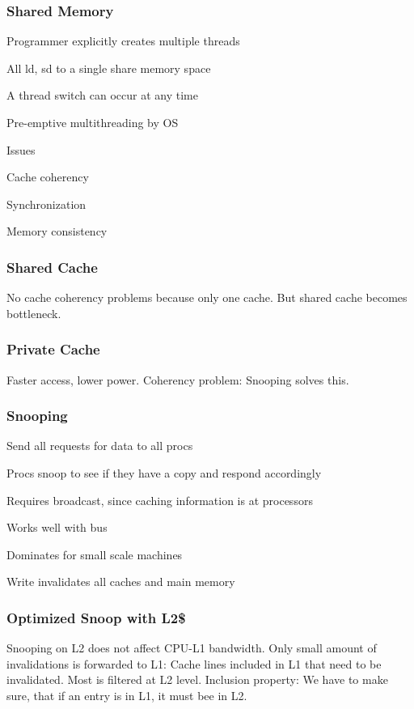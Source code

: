 \documentclass[a4paper, fontsize=8pt, landscape, DIV=1]{scrartcl}
\makeatletter
\renewenvironment{outline}[1][]{%
  \ifthenelse{\equal{#1}{}}{}{\renewcommand{\ol@type}{#1}}%
  \ol@z%
  \newcommand{\0}{\ol@toz\ol@z}%
  \newcommand{\1}{\vspace{\dimexpr\outlinespacingscalar\baselineskip-\baselineskip}\ol@toi\ol@i\item}%
  \newcommand{\2}{\vspace{\dimexpr\outlinespacingscalartwo\baselineskip-\baselineskip}\ol@toii\ol@ii\item}%
  \newcommand{\3}{\vspace{\dimexpr\outlinespacingscalar\baselineskip-\baselineskip}\ol@toiii\ol@iii\item}%
  \newcommand{\4}{\vspace{\dimexpr\outlinespacingscalar\baselineskip-\baselineskip}\ol@toiiii\ol@iiii\item}%
}{%
  \ol@toz\ol@exit%
}
\def\outlinespacingscalar{0.5}
\def\outlinespacingscalartwo{0.5}
\makeatother
\begin{document}
\begin{multicols*}{4}
  \subsubsection{Shared Memory}
  \begin{outline}
    \1 Programmer explicitly creates multiple threads
    \1 All ld, sd to a single share memory space
    \1 A thread switch can occur at any time
      \2 Pre-emptive multithreading by OS
    \1 Issues
      \2 Cache coherency
      \2 Synchronization
      \2 Memory consistency
  \end{outline}

  \subsubsection{Shared Cache}
  No cache coherency problems because only one cache. But shared cache becomes
  bottleneck.

  \subsubsection{Private Cache}
  Faster access, lower power. Coherency problem: Snooping solves this.

  \subsubsection{Snooping}
  \begin{outline}
    \1 Send all requests for data to all procs
    \1 Procs snoop to see if they have a copy and respond accordingly
    \1 Requires broadcast, since caching information is at processors
    \1 Works well with bus
    \1 Dominates for small scale machines
    \1 Write invalidates all caches and main memory
  \end{outline}


  \subsubsection{Optimized Snoop with L2\$}
  Snooping on L2 does not affect CPU-L1 bandwidth. Only small amount of invalidations
  is forwarded to L1: Cache lines included in L1 that need to be invalidated. Most
  is filtered at L2 level. Inclusion property: We have to make sure, that if an entry 
  is in L1, it must bee in L2.


\end{multicols*}
\end{document}

